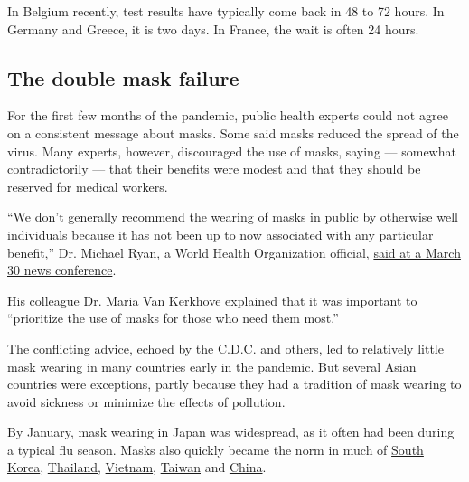 In Belgium recently, test results have typically come back in 48 to 72
hours. In Germany and Greece, it is two days. In France, the wait is
often 24 hours.

\hypertarget{the-double-mask-failure}{%
\subsection{The double mask failure}\label{the-double-mask-failure}}

For the first few months of the pandemic, public health experts could
not agree on a consistent message about masks. Some said masks reduced
the spread of the virus. Many experts, however, discouraged the use of
masks, saying --- somewhat contradictorily --- that their benefits were
modest and that they should be reserved for medical workers.

``We don't generally recommend the wearing of masks in public by
otherwise well individuals because it has not been up to now associated
with any particular benefit,'' Dr. Michael Ryan, a World Health
Organization official,
\href{https://www.who.int/docs/default-source/coronaviruse/transcripts/who-audio-emergencies-coronavirus-press-conference-full-30mar2020.pdf?sfvrsn=6b68bc4a_2}{said
at a March 30 news conference}.

His colleague Dr. Maria Van Kerkhove explained that it was important to
``prioritize the use of masks for those who need them most.''

The conflicting advice, echoed by the C.D.C. and others, led to
relatively little mask wearing in many countries early in the pandemic.
But several Asian countries were exceptions, partly because they had a
tradition of mask wearing to avoid sickness or minimize the effects of
pollution.

By January, mask wearing in Japan was widespread, as it often had been
during a typical flu season. Masks also quickly became the norm in much
of
\href{https://www.deseret.com/opinion/2020/7/11/21320058/masks-covid-19-media-utah-governor-inside-the-newsroom-the-culture-south-korea}{South
Korea},
\href{https://www.nytimes.com/2020/07/16/world/asia/coronavirus-thailand-photos.html?searchResultPosition=2}{Thailand},
\href{https://saigoneer.com/saigon-culture/18648-already-ubiquitous,-face-masks-become-the-symbol-of-vietnam-s-new-normal}{Vietnam},
\href{https://www.ncbi.nlm.nih.gov/pmc/articles/PMC7270822/}{Taiwan} and
\href{https://www.sciencemag.org/news/2020/03/not-wearing-masks-protect-against-coronavirus-big-mistake-top-chinese-scientist-says}{China}.

